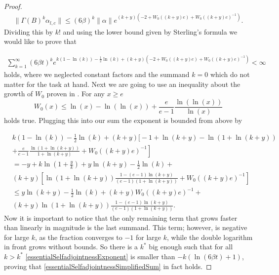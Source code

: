 \documentclass[b5paper,draft,openbib,12pt]{memoir}
\begin{document}
\begin{proof}
\begin{align}
\|\Gamma(B)^k\alpha_{l,c}\|\le (6\beta )^k \|\alpha\| e^{(k+y)(-2+W_0((k+y)e) + W_0((k+y)e)^{-1})}.
\end{align}
Dividing this by \(k!\) and using the lower bound given by Sterling's formula we would like to prove that 

\begin{align}\label{essentialSelfadjointnessSimplifiedSum}
\sum_{k=1}^\infty (6\beta t )^k   e^{k(1-\ln(k))-\frac{1}{2}\ln(k) +(k+y)(-2+W_0((k+y)e) + W_0((k+y)e)^{-1})}<\infty
\end{align}
holds, where we neglected constant factors and the summand \(k=0\) which do not matter for the task at hand. Next we are going
to use an inequality about the growth of \(W_0\) proven in \cite{hoorfar2008inequalities}. For any \(x\ge e\) 
\begin{equation}
W_0(x)\le \ln(x)-\ln( \ln (x)) + \frac{e}{e-1}\frac{\ln (\ln (x))}{\ln (x)}
\end{equation}
holds true. Plugging this into our sum the exponent is bounded from above by

\begin{align}\nonumber
&k(1-\ln(k))-\frac{1}{2}\ln(k) +(k+y)\Big[-1+\ln(k+y) - \ln(1+ \ln (k+y))\\ \nonumber
&\left.+\frac{e}{e-1} \frac{\ln(1+\ln(k+y))}{1+\ln(k+y)} + W_0((k+y)e)^{-1}\right]\\\nonumber
&=-y + k \ln\left(1+\frac{y}{k}\right) + y \ln (k+y) -\frac{1}{2}\ln(k) +\\\nonumber
&(k+y)\left[ \ln (1+\ln(k+y))\frac{1-(e-1)\ln(k+y)}{(e-1)(1+\ln(k+y))} + W_0((k+y)e)^{-1}\right]\\\label{essentialSelfadjointnessExponent}
&\le y \ln (k+y) -\frac{1}{2}\ln(k) + (k+y)W_0((k+y)e)^{-1} +\\\nonumber
&(k+y) \ln (1+\ln(k+y))\frac{1-(e-1)\ln(k+y)}{(e-1)(1+\ln(k+y))} .
\end{align}
Now it is important to notice that the only remaining term that grows 
faster than linearly in magnitude is the last summand.
This term; however, is negative for large \(k\), as the fraction converges 
to \(-1\) for large \(k\), while the double logarithm
in front grows without bounds. So there is a \(k^*\) big enough such that  for all \(k>k^*\) \eqref{essentialSelfadjointnessExponent} 
is smaller than \(- k (\ln(6\beta t) + 1)\), proving that \eqref{essentialSelfadjointnessSimplifiedSum} in fact holds.

\end{proof}
\end{document}
